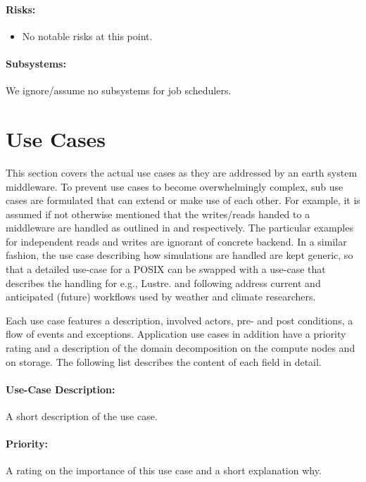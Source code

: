 \paragraph{Risks:}
\begin{itemize}
	\item No notable risks at this point.
\end{itemize}


\paragraph{Subsystems:}
We ignore/assume no subsystems for job schedulers.





\section{Use Cases}
\label{sec:use cases/use cases}

This section covers the actual use cases as they are addressed by an earth system middleware.
To prevent use cases to become overwhelmingly complex, sub use cases are formulated that can extend or make use of each other.
For example, it is assumed if not otherwise mentioned that the writes/reads handed to a middleware are handled as outlined in  and  respectively.
The particular examples for independent reads and writes are ignorant of concrete backend.
In a similar fashion, the use case describing how simulations are handled are kept generic, so that a detailed use-case for a POSIX can be swapped with a use-case that describes the handling for e.g., Lustre.
 and following address current and anticipated (future) workflows used by weather and climate researchers.

Each use case features a description, involved actors, pre- and post conditions, a flow of events and exceptions.
Application use cases in addition have a priority rating and a description of the domain decomposition on the compute nodes and on storage.
The following list describes the content of each field in detail.


\paragraph{Use-Case Description:} A short description of the use case.

\paragraph{Priority:} A rating on the importance of this use case and a short explanation why.

